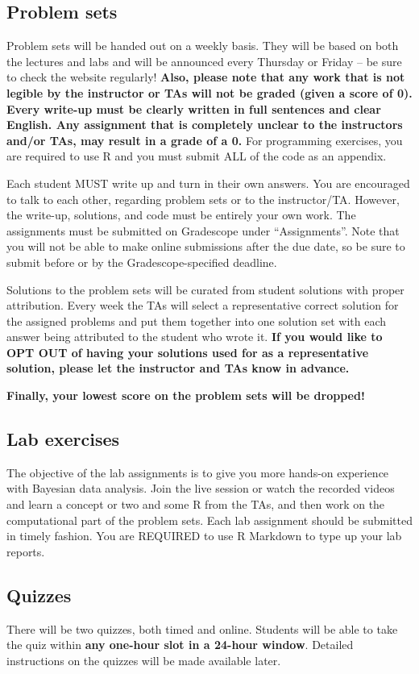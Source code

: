 \documentclass[11pt, a4paper]{article}
\begin{document}
\subsection{Problem sets}
Problem sets will be handed out on a weekly basis. They will be based on both the lectures and labs and will be announced every Thursday or Friday -- be sure to check the website regularly! \textbf{Also, please note that any work that is not legible by the instructor or TAs will not be graded (given a score  of 0). Every write-up must be clearly written in full sentences and clear English. Any assignment that is completely unclear to the instructors and/or TAs, may result in a grade of a 0.} For programming exercises, you are required to use R and you must submit ALL of the code as an appendix.  

Each student MUST write up and turn in their own answers. You are encouraged to talk to each other, regarding problem sets or to the instructor/TA. However, the write-up, solutions, and code must be entirely your own work. The assignments must be submitted on Gradescope under ``Assignments''. Note that you will not be able to make online submissions after the due date, so be sure to submit before or by the Gradescope-specified deadline.

Solutions to the problem sets will be curated from student solutions with proper attribution. Every week the TAs will select a representative correct solution for the assigned problems and put them together into one solution set with each answer being attributed to the student who wrote it. \textbf{If you would like to OPT OUT of having your solutions used for as a representative solution, please let the instructor and TAs know in advance.}

\textbf{Finally, your lowest score on the problem sets will be dropped!}

\subsection{Lab exercises}
The objective of the lab assignments is to give you more hands-on experience with Bayesian data analysis. Join the live session or watch the recorded videos and learn a concept or two and some R from the TAs, and then work on the computational part of the problem sets. Each lab assignment should be submitted in timely fashion. You are REQUIRED to use R Markdown to type up your lab reports.

\subsection{Quizzes}
There will be two quizzes, both timed and online. Students will be able to take the quiz within \textbf{any one-hour slot in a 24-hour window}. Detailed instructions on the quizzes will be made available later.
\end{document}
